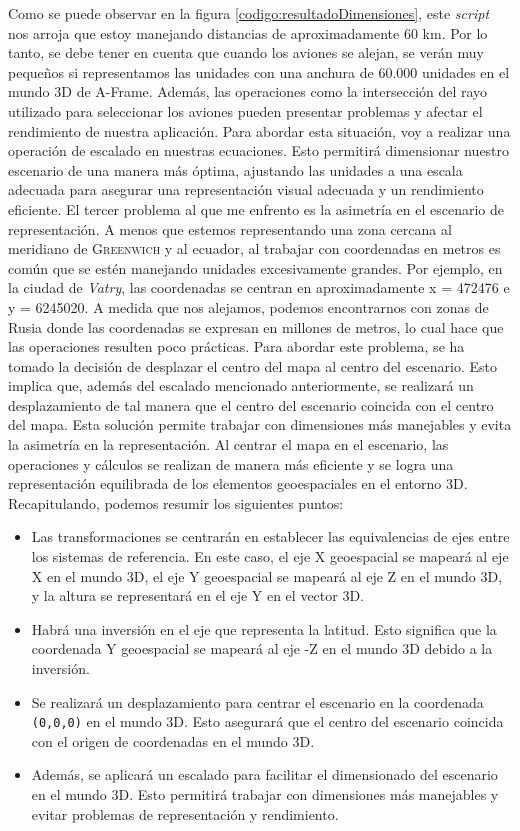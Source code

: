 \documentclass[a4paper, 11pt]{book}
\begin{document}
Como se puede observar en la figura \ref{codigo:resultadoDimensiones}, este \emph{script} nos arroja que estoy manejando distancias de aproximadamente 60 km. 
Por lo tanto, se debe tener en cuenta que cuando los aviones se alejan, se verán muy pequeños si representamos las unidades con una anchura de 60.000 unidades en el mundo 3D de A-Frame. Además, las operaciones como la intersección del rayo utilizado para seleccionar los aviones pueden presentar problemas y afectar el rendimiento de nuestra aplicación.
Para abordar esta situación, voy a realizar una operación de escalado en nuestras ecuaciones. Esto permitirá dimensionar nuestro escenario de una manera más óptima, ajustando las unidades a una escala adecuada para asegurar una representación visual adecuada y un rendimiento eficiente.
\newpage
El tercer problema al que me enfrento es la asimetría en el escenario de representación. A menos que estemos representando una zona cercana al meridiano de \textsc{Greenwich} y al ecuador, al trabajar con coordenadas en metros es común que se estén manejando unidades excesivamente grandes. Por ejemplo, en la ciudad de \emph{Vatry}, las coordenadas se centran en aproximadamente x = 472476 e y = 6245020. A medida que nos alejamos, podemos encontrarnos con zonas de Rusia donde las coordenadas se expresan en millones de metros, lo cual hace que las operaciones resulten poco prácticas.
Para abordar este problema, se ha tomado la decisión de desplazar el centro del mapa al centro del escenario. Esto implica que, además del escalado mencionado anteriormente, se realizará un desplazamiento de tal manera que el centro del escenario coincida con el centro del mapa.
Esta solución permite trabajar con dimensiones más manejables y evita la asimetría en la representación. Al centrar el mapa en el escenario, las operaciones y cálculos se realizan de manera más eficiente y se logra una representación equilibrada de los elementos geoespaciales en el entorno 3D.
Recapitulando, podemos resumir los siguientes puntos:
\begin{itemize}
    \item Las transformaciones se centrarán en establecer las equivalencias de ejes entre los sistemas de referencia. En este caso, el eje \textsc{X} \gls{geoespacial} se mapeará al eje X en el mundo \textsc{3D}, el eje Y geoespacial se mapeará al eje \textsc{Z} en el mundo \textsc{3D}, y la altura se representará en el eje Y en el vector 3D.
    \item Habrá una inversión en el eje que representa la latitud. Esto significa que la coordenada Y geoespacial se mapeará al eje \textsc{-Z} en el mundo \textsc{3D} debido a la inversión.
    \item Se realizará un desplazamiento para centrar el escenario en la coordenada \texttt{(0,0,0)} en el mundo \textsc{3D}. Esto asegurará que el centro del escenario coincida con el origen de coordenadas en el mundo \textsc{3D}.
    \item Además, se aplicará un escalado para facilitar el dimensionado del escenario en el mundo \textsc{3D}. Esto permitirá trabajar con dimensiones más manejables y evitar problemas de representación y rendimiento.
\end{itemize}
\end{document}
